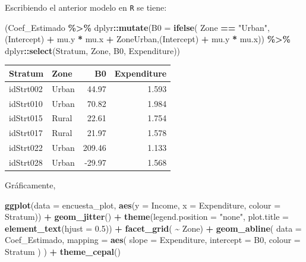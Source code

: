 \documentclass[
  12pt,
]{book}
\newenvironment{Shaded}{\begin{snugshade}}{\end{snugshade}}
\newcommand{\AttributeTok}[1]{\textcolor[rgb]{0.13,0.29,0.53}{#1}}
\newcommand{\FloatTok}[1]{\textcolor[rgb]{0.00,0.00,0.81}{#1}}
\newcommand{\FunctionTok}[1]{\textcolor[rgb]{0.13,0.29,0.53}{\textbf{#1}}}
\newcommand{\NormalTok}[1]{#1}
\newcommand{\SpecialCharTok}[1]{\textcolor[rgb]{0.81,0.36,0.00}{\textbf{#1}}}
\newcommand{\StringTok}[1]{\textcolor[rgb]{0.31,0.60,0.02}{#1}}
\begin{document}
Escribiendo el anterior modelo en \texttt{R} se tiene:

\begin{Shaded}
\begin{Highlighting}[]
\NormalTok{(Coef\_Estimado }\SpecialCharTok{\%\textgreater{}\%}\NormalTok{  dplyr}\SpecialCharTok{::}\FunctionTok{mutate}\NormalTok{(}\AttributeTok{B0 =} \FunctionTok{ifelse}\NormalTok{( Zone }\SpecialCharTok{==} \StringTok{"Urban"}\NormalTok{, }\StringTok{\textasciigrave{}}\AttributeTok{(Intercept)}\StringTok{\textasciigrave{}} \SpecialCharTok{+}\NormalTok{ mu.y }\SpecialCharTok{*}\NormalTok{ mu.x }\SpecialCharTok{+}\NormalTok{ ZoneUrban,}\StringTok{\textasciigrave{}}\AttributeTok{(Intercept)}\StringTok{\textasciigrave{}} \SpecialCharTok{+}\NormalTok{ mu.y }\SpecialCharTok{*}\NormalTok{ mu.x)) }\SpecialCharTok{\%\textgreater{}\%}
\NormalTok{  dplyr}\SpecialCharTok{::}\FunctionTok{select}\NormalTok{(Stratum, Zone, B0, Expenditure))}
\end{Highlighting}
\end{Shaded}

\begin{tabular}{l|l|r|r}
\hline
Stratum & Zone & B0 & Expenditure\\
\hline
idStrt002 & Urban & 44.97 & 1.593\\
\hline
idStrt010 & Urban & 70.82 & 1.984\\
\hline
idStrt015 & Rural & 22.61 & 1.754\\
\hline
idStrt017 & Rural & 21.97 & 1.578\\
\hline
idStrt022 & Urban & 209.46 & 1.133\\
\hline
idStrt028 & Urban & -29.97 & 1.568\\
\hline
\end{tabular}

Gráficamente,

\begin{Shaded}
\begin{Highlighting}[]
\FunctionTok{ggplot}\NormalTok{(}\AttributeTok{data =}\NormalTok{ encuesta\_plot,}
       \FunctionTok{aes}\NormalTok{(}\AttributeTok{y =}\NormalTok{ Income, }\AttributeTok{x =}\NormalTok{ Expenditure,}
           \AttributeTok{colour =}\NormalTok{ Stratum)) }\SpecialCharTok{+}
  \FunctionTok{geom\_jitter}\NormalTok{() }\SpecialCharTok{+}
  \FunctionTok{theme}\NormalTok{(}\AttributeTok{legend.position =} \StringTok{"none"}\NormalTok{,}
        \AttributeTok{plot.title =} \FunctionTok{element\_text}\NormalTok{(}\AttributeTok{hjust =} \FloatTok{0.5}\NormalTok{)) }\SpecialCharTok{+}
  \FunctionTok{facet\_grid}\NormalTok{( }\SpecialCharTok{\textasciitilde{}}\NormalTok{ Zone) }\SpecialCharTok{+}
  \FunctionTok{geom\_abline}\NormalTok{(}
    \AttributeTok{data =}\NormalTok{ Coef\_Estimado,}
    \AttributeTok{mapping =} \FunctionTok{aes}\NormalTok{(}
      \AttributeTok{slope =}\NormalTok{ Expenditure,}
      \AttributeTok{intercept =}\NormalTok{ B0,}
      \AttributeTok{colour =}\NormalTok{ Stratum}
\NormalTok{    )}
\NormalTok{  ) }\SpecialCharTok{+}
  \FunctionTok{theme\_cepal}\NormalTok{()}
\end{Highlighting}
\end{Shaded}
\end{document}
